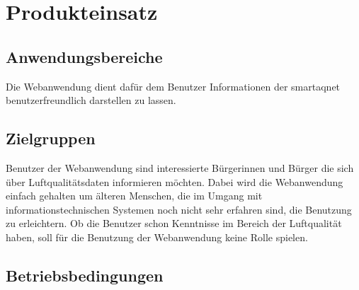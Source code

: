 \section{Produkteinsatz}

\subsection{Anwendungsbereiche}

Die \gls{Webanwendung} dient dafür dem Benutzer Informationen der \gls{smartaqnet} benutzerfreundlich darstellen zu lassen.

\subsection{Zielgruppen}

Benutzer der \gls{Webanwendung} sind interessierte Bürgerinnen und Bürger die sich über Luftqualitätsdaten informieren möchten. 
Dabei wird die \gls{Webanwendung} einfach gehalten um älteren Menschen, die im Umgang mit informationstechnischen Systemen noch nicht sehr erfahren sind, die Benutzung zu erleichtern.
Ob die Benutzer schon Kenntnisse im Bereich der Luftqualität haben, soll für die Benutzung der \gls{Webanwendung} keine Rolle spielen.

\subsection{Betriebsbedingungen}

